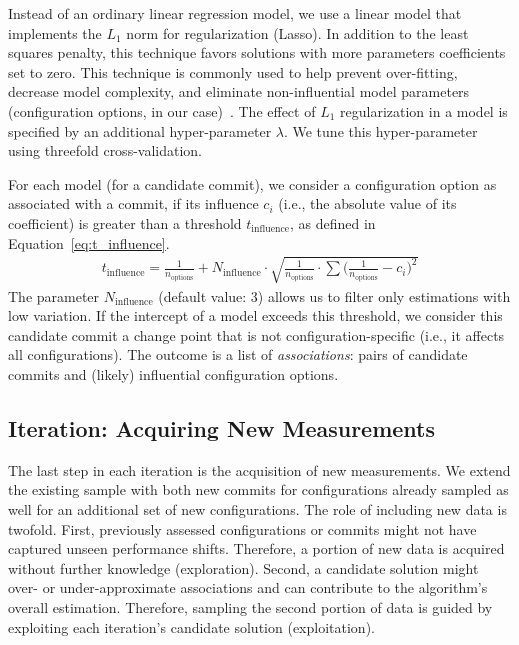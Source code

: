 \documentclass[sigconf]{acmart}
\begin{document}
	Instead of an ordinary linear regression model, we use a linear model that implements the $L_1$ norm for regularization (Lasso). In addition to the least squares penalty, this technique favors solutions with more parameters coefficients set to zero.
	This technique is commonly used to help prevent over-fitting, decrease model complexity, and eliminate non-influential model parameters (configuration options, in our case)~\cite{lasso}. The effect of $L_1$ regularization in a model is specified by an additional hyper-parameter $\lambda$. We tune this hyper-parameter using threefold cross-validation.
	
	For each model (for a candidate commit), we consider a configuration option as associated with a commit, if its influence $c_i$ (i.e., the absolute value of its coefficient) is greater than a threshold $t_\text{influence}$, as defined in Equation~\ref{eq:t_influence}.
	\begin{equation}
	\begin{gathered}
	t_\text{influence} = \frac{1}{n_\text{options}} + N_\text{influence} \cdot \sqrt{\frac{1}{n_\text{options}} \cdot \sum \Big(\frac{1}{n_\text{options}} - c_i\Big)^2}
	\label{eq:t_influence}
	\end{gathered}
	\end{equation}
	The parameter $N_\text{influence}$ (default value: 3) allows us to filter only estimations with low variation. If the intercept of a model exceeds this threshold, we consider this candidate commit a change point that is not configuration-specific (i.e., it affects all configurations). The outcome is a list of \emph{associations}: pairs of candidate commits and (likely) influential configuration options. 
	
	\subsection{Iteration: Acquiring New Measurements}\label{sec:acquisition}
	The last step in each iteration is the acquisition of new measurements. We extend the existing sample with both new commits for configurations already sampled as well for an additional set of new configurations. The role of including new data is twofold. First, previously assessed configurations or commits might not have captured unseen performance shifts. Therefore, a portion of new data is acquired without further knowledge (exploration). Second, a candidate solution might over- or under-approximate associations and can contribute to the algorithm's overall estimation. Therefore, sampling the second portion of data is guided by exploiting each iteration's candidate solution (exploitation).
	
\end{document}
